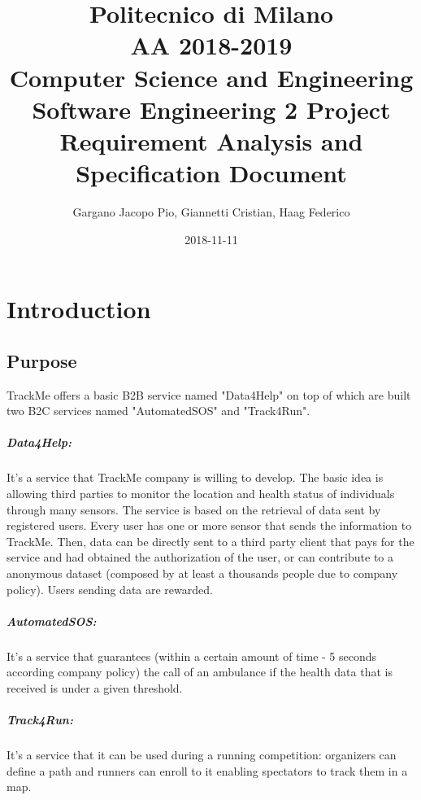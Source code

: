 \documentclass{report}
\title{
\small Politecnico di Milano\\
\small AA 2018-2019\\
\large Computer Science and Engineering\\
\Large Software Engineering 2 Project\\
\huge Requirement Analysis and Specification Document
}
\date{2018-11-11}
\author{
\large Gargano Jacopo Pio, Giannetti Cristian, Haag Federico}
\begin{document}
	\maketitle
	
	\newpage
	\tableofcontents
	
	\newpage
	\chapter{Introduction}
		\section{Purpose}
			TrackMe offers a basic B2B service named "Data4Help" on top of which are built two B2C services named "AutomatedSOS" and "Track4Run".
			\paragraph{Data4Help:} It's a service that TrackMe company is willing to develop. The basic idea is allowing third parties to monitor the location and health status of individuals through many sensors. The service is based on the retrieval of data sent by registered users. Every user has one or more sensor that sends the information to TrackMe. Then, data can be directly sent to a third party client that pays for the service and had obtained the authorization of the user, or can contribute to a anonymous dataset (composed by at least a thousands people due to company policy). Users sending data are rewarded.\\
			
			\paragraph{AutomatedSOS:}It's a service that guarantees (within a certain amount of time - 5 seconds according company policy) the call of an ambulance if the health data that is received is under a given threshold.
			
			\paragraph{Track4Run:} It's a service that it can be used during a running competition: organizers can define a path and runners can enroll to it enabling spectators to track them in a map.
\end{document}
